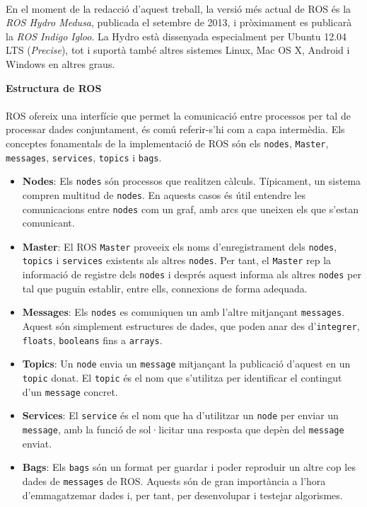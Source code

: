 \documentclass[12pt,a4paper,final,twoside]{article}
\begin{document}
\paragraph{}En el moment de la redacció d'aquest treball, la versió més actual de ROS és la \textit{ROS Hydro Medusa}, publicada el setembre de 2013, i pròximament es publicarà la \textit{ROS Indigo Igloo}. La Hydro està dissenyada especialment per Ubuntu 12.04 LTS (\textit{Precise}), tot i suportà també altres sistemes Linux, Mac OS X, Android i Windows en altres graus.


\vspace{20pt}
\textbf{Estructura de ROS}
\paragraph{}ROS ofereix una interfície que permet la comunicació entre processos per tal de processar dades conjuntament, és comú referir-s'hi com a capa intermèdia. Els conceptes fonamentals de la implementació de ROS són els \texttt{nodes}, \texttt{Master}, \texttt{messages}, \texttt{services}, \texttt{topics} i \texttt{bags}.

\begin{itemize}
\item \textbf{Nodes}: Els \texttt{nodes} són processos que realitzen càlculs. Típicament, un sistema compren multitud de \texttt{nodes}. En aquests casos és útil entendre les comunicacions entre \texttt{nodes} com un graf, amb arcs que uneixen els que s'estan comunicant.

\item \textbf{Master}: El ROS \texttt{Master} proveeix els noms d'enregistrament dels \texttt{nodes}, \texttt{topics} i \texttt{services} existents als altres \texttt{nodes}. Per tant, el \texttt{Master} rep la informació de registre dels \texttt{nodes} i després aquest informa als altres \texttt{nodes} per tal que puguin establir, entre ells, connexions de forma adequada. 

\item \textbf{Messages}: Els \texttt{nodes} es comuniquen un amb l'altre mitjançant \texttt{messages}. Aquest són simplement estructures de dades, que poden anar des d'\texttt{integrer}, \texttt{floats}, \texttt{booleans} fins a \texttt{arrays}.

\item \textbf{Topics}: Un \texttt{node} envia un \texttt{message} mitjançant la publicació d'aquest en un \texttt{topic} donat. El \texttt{topic} és el nom que s'utilitza per identificar el contingut d'un \texttt{message} concret. 

\item \textbf{Services}: El \texttt{service} és el nom que ha d'utilitzar un \texttt{node} per enviar un \texttt{message}, amb la funció de sol·licitar una resposta que depèn del \texttt{message} enviat.

\item \textbf{Bags}: Els \texttt{bags} són un format per guardar i poder reproduir un altre cop les dades de \texttt{messages} de ROS. Aquests són de gran importància a l'hora d'emmagatzemar dades i, per tant, per desenvolupar i testejar algorismes.
\end{itemize}
\end{document}
